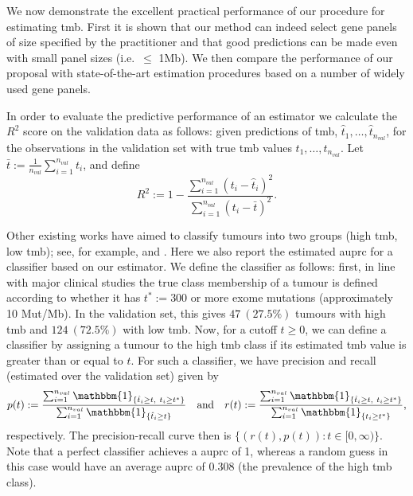 \documentclass[../thesis.tex]{subfiles}
\begin{document}
We now demonstrate the excellent practical performance of our procedure for estimating \gls{tmb}.  First it is shown that our method can indeed select gene panels of size specified by the practitioner and that good predictions can be made even with small panel sizes (i.e.~$\leq$ 1Mb). We then compare the performance of our proposal with state-of-the-art estimation procedures based on a number of widely used gene panels.

In order to evaluate the predictive performance of an estimator we calculate the $R^2$ score on the validation data as follows: given predictions of \gls{tmb}, $\hat{t}_1, \ldots, \hat{t}_{n_{val}}$, for the observations in the validation set with true \gls{tmb} values $t_1, \ldots, t_{n_{val}}$. Let $\bar{t} := \frac{1}{n_{val}} \sum_{i=1}^{n_{val}} t_i$, and define 
    \[
    R^2 := 1- \frac{\sum_{i =1}^{n_{val}}(t_i - \hat{t}_i)^2}{\sum_{i = 1}^{n_{val}}(t_i - \bar{t})^2}. 
    \]
    
 Other existing works have aimed to classify tumours into two groups (high \gls{tmb}, low \gls{tmb}); see, for example, \citet{buttner_implementing_2019} and \citet{wu_designing_2019}. Here we also report the estimated \gls{auprc} for a classifier based on our estimator. We define the classifier as follows: first, in line with major clinical studies \citep[e.g.][]{hellmann_nivolumab_2018, ramalingam_tumor_2018} the true class membership of a tumour is defined according to whether it has $t^* := 300$ or more exome mutations (approximately 10 Mut/Mb). In the validation set, this gives $47 \ (27.5 \% )$ tumours with high \gls{tmb} and $124 \ (72.5 \% ) $ with low \gls{tmb}. Now, for a cutoff $t \geq 0$, we can define a classifier by assigning a tumour to the high \gls{tmb} class if its estimated \gls{tmb} value is greater than or equal to $t$.  For such a classifier, we have precision and recall (estimated over the validation set) given by
 \[
 p(t) := \frac{\sum_{i=1}^{n_{val}} \mathbbm{1}_{\{\hat{t}_i \geq t, \ t_i \geq t^*\}}}{\sum_{i=1}^{n_{val}} \mathbbm{1}_{\{\hat{t}_i \geq t\}}} \quad \text{and} \quad   r(t) := \frac{\sum_{i=1}^{n_{val}} \mathbbm{1}_{\{\hat{t}_i \geq t, \ t_i \geq t^*\}}}{\sum_{i=1}^{n_{val}} \mathbbm{1}_{\{t_i \geq t^*\}}},
 \]
respectively.  The precision-recall curve then is $\{(r(t),p(t)): t \in [0, \infty)\}$. Note that a perfect classifier achieves a \gls{auprc} of 1, whereas a random guess in this case would have an average \gls{auprc} of 0.308 (the prevalence of the high \gls{tmb} class).
\end{document}
